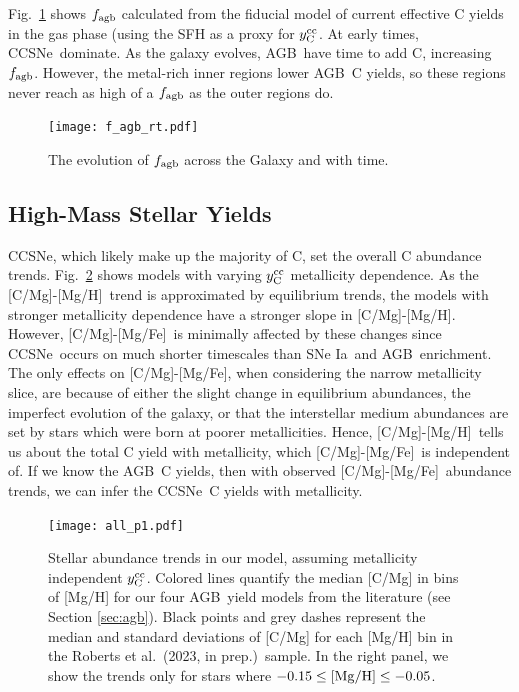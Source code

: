 \documentclass[fleqn,usenatbib]{mnras}
\newcommand{\citetjack}{Roberts et al.~(2023, in prep.)}
\newcommand{\agb}{AGB}
\newcommand{\cc}{CCSNe}
\newcommand{\ia}{SNe Ia}
\newcommand{\caah}{[C/Mg]-[Mg/H]}
\newcommand{\caafe}{[C/Mg]-[Mg/Fe]}
\newcommand{\Ycc}{\ensuremath{y_{\rm C}^{\rm cc}}}
\begin{document}
Fig.~\ref{fig:f_agb_evo} shows $f_{\rm agb}$ calculated from the fiducial model of current effective C yields in the gas phase (using the SFH as a proxy for $\Ycc$. 
At early times, \cc\ dominate. As the galaxy evolves, \agb\ have time to add C, increasing $f_{\rm agb}$. However, the metal-rich inner regions lower \agb\ C yields, so these regions never reach as high of a $f_{\rm agb}$ as the outer regions do. 

\begin{figure}
    \centering
    \texttt{[image: f\_agb\_rt.pdf]}
    \caption[]{The evolution of $f_{\rm agb}$ across the Galaxy and with time.}
    \label{fig:f_agb_evo}
\end{figure}




\subsection{High-Mass Stellar Yields}\label{sec:results_highmass}

\cc, which likely make up the majority of C, set the overall C abundance trends.
 Fig.~\ref{fig:first_models} shows models with varying $\Ycc$ metallicity dependence. As the \caah~trend is approximated by equilibrium trends, the models with stronger metallicity dependence have a stronger slope in \caah. 
 However, \caafe~is minimally affected by these changes since \cc\ occurs on much shorter timescales than \ia\ and \agb\ enrichment. The only effects on \caafe, when considering the narrow metallicity slice, are because of either the slight change in equilibrium abundances, the imperfect evolution of the galaxy, or that the interstellar medium abundances are set by stars which were born at poorer metallicities. 
 Hence, \caah\ tells us about the total C yield with metallicity, which \caafe\ is independent of. If we know the \agb\ C yields, then with observed \caafe\ abundance trends, we can infer the \cc\ C yields with metallicity.


\begin{figure}
\texttt{[image: all\_p1.pdf]}

\caption[]{
    Stellar abundance trends in our model, assuming metallicity independent $\Ycc$. Colored lines quantify the median [C/Mg] in bins of [Mg/H] for our four \agb\ yield models from the literature (see Section \ref{sec:agb}). Black points and grey dashes represent the median and standard deviations of [C/Mg] for each [Mg/H] bin in the \citetjack~sample. In the right panel, we show the trends only for stars where $-0.15\leq {\rm [Mg/H]}\leq -0.05$.
}
\label{fig:first_models}
\end{figure}
\end{document}
